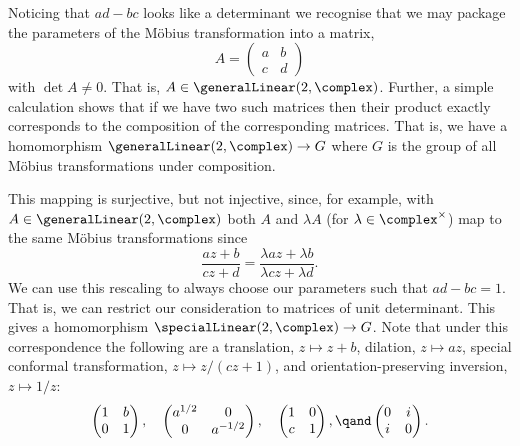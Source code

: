 \documentclass[fleqn]{NotesClass}
\begin{document}
    Noticing that \(ad - bc\) looks like a determinant we recognise that we may package the parameters of the M\"obius transformation into a matrix,
    \begin{equation}
        A = 
        \begin{pmatrix}
            a & b\\
            c & d
        \end{pmatrix}
    \end{equation}
    with \(\det A \ne 0\).
    That is, \(A \in \generalLinear(2, \complex)\).
    Further, a simple calculation shows that if we have two such matrices then their product exactly corresponds to the composition of the corresponding matrices.
    That is, we have a homomorphism \(\generalLinear(2, \complex) \to G\) where \(G\) is the group of all M\"obius transformations under composition.
    
    This mapping is surjective, but not injective, since, for example, with \(A \in \generalLinear(2, \complex)\) both \(A\) and \(\lambda A\) (for \(\lambda \in \complex^{\times}\)) map to the same M\"obius transformations since
    \begin{equation}
        \frac{az + b}{cz + d} = \frac{\lambda az + \lambda b}{\lambda cz + \lambda d}.
    \end{equation}
    We can use this rescaling to always choose our parameters such that \(ad - bc = 1\).
    That is, we can restrict our consideration to matrices of unit determinant.
    This gives a homomorphism \(\specialLinear(2, \complex) \to G\).
    Note that under this correspondence the following are a translation, \(z \mapsto z + b\), dilation, \(z \mapsto az\), special conformal transformation, \(z \mapsto z/(cz + 1)\), and orientation-preserving inversion, \(z \mapsto 1/z\):
    \begin{equation}
        \begin{pmatrix}
            1 & b\\
            0 & 1
        \end{pmatrix}
        , \quad 
        \begin{pmatrix}
            a^{1/2} & 0\\
            0 & a^{-1/2}
        \end{pmatrix}
        , \quad
        \begin{pmatrix}
            1 & 0\\
            c & 1
        \end{pmatrix}
        , \qand 
        \begin{pmatrix}
            0 & i\\
            i & 0
        \end{pmatrix}
        .
    \end{equation}
    
\end{document}
